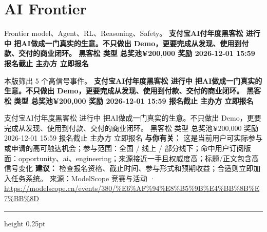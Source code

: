 \documentclass[10.5pt]{ctexart}
\begin{document}
\section*{AI Frontier}
{\color{ormuted} Frontier model、Agent、RL、Reasoning、Safety。}
\vspace{2mm}
{\LARGE\bfseries 支付宝AI付年度黑客松 进行中 把AI做成一门真实的生意。不只做出 Demo，更要完成从发现、使用到付款、交付的商业闭环。 黑客松 类型 总奖池¥200,000 奖励 2026-12-01 15:59 报名截止 主办方 立即报名}\par
\vspace{1mm}
{\color{ormuted} 本版筛出 5 个高信号事件。}
\vspace{3mm}
{\Large\bfseries 支付宝AI付年度黑客松 进行中 把AI做成一门真实的生意。不只做出 Demo，更要完成从发现、使用到付款、交付的商业闭环。 黑客松 类型 总奖池¥200,000 奖励 2026-12-01 15:59 报名截止 主办方 立即报名}\par
支付宝AI付年度黑客松 进行中 把AI做成一门真实的生意。不只做出 Demo，更要完成从发现、使用到付款、交付的商业闭环。 黑客松 类型 总奖池¥200,000 奖励 2026-12-01 15:59 报名截止 主办方 立即报名
\textbf{与你有关：} 这是当前用户可实际参与或申请的高可触达机会；参与范围：全国 / 线上 / 部分线下；命中用户订阅版面：opportunity、ai、engineering；来源接近一手且权威度高；标题/正文包含高信号变化
\textbf{建议：} 检查报名资格、截止时间、参与形式和预期收益；合适则立即加入任务系统。
{\footnotesize\color{ormuted} 来源：ModelScope 竞赛与活动 · \url{https://modelscope.cn/events/380/%E6%AF%94%E8%B5%9B%E4%BB%8B%E7%BB%8D}}
\vspace{4mm}
\hrule height 0.25pt
\vspace{3mm}
\end{document}
